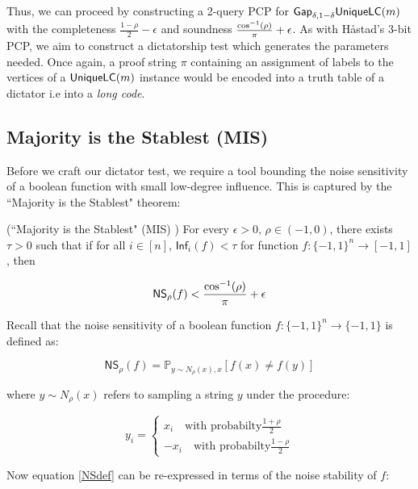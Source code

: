 Thus, we can proceed by constructing a 2-query PCP for $\mathsf{Gap}_{\delta, 1-\delta}\mathsf{UniqueLC}(m)$ with the completeness $\frac{1-\rho}{2} - \epsilon$ and soundness $\frac{\cos^{-1}(\rho)}{\pi} + \epsilon$. As with H\aa stad's 3-bit PCP, we aim to construct a dictatorship test which generates the parameters needed. Once again, a proof string $\pi$ containing an assignment of labels to the vertices of a $\mathsf{UniqueLC}(m)$ instance would be encoded into a truth table of a dictator i.e into a \emph{long code}. \newline

%
%
%
\subsection{Majority is the Stablest (MIS)}
%
Before we craft our dictator test, we require a tool bounding the noise sensitivity of a boolean function with small low-degree influence. This is captured by the ``Majority is the Stablest" theorem:

\begin{theorem} (``Majority is the Stablest" (MIS) \cite{mossel2005noise})
For every $\epsilon > 0$, $\rho \in (-1,0)$, there exists $\tau > 0$ such that if for all $i \in [n]$, $\mathsf{Inf}_i(f) < \tau$ for function $f:\{-1,1\}^n \rightarrow [-1,1]$, then

\begin{equation}
  \mathsf{NS}_{\rho}(f) < \frac{\cos^{-1}(\rho)}{\pi} + \epsilon
\end{equation}
\end{theorem}

Recall that the noise sensitivity of a boolean function $f:\{-1,1\}^n \rightarrow \{-1,1\}$ is defined as:

\begin{equation} \label{NSdef}
  \mathsf{NS}_\rho(f)  = \mathbb{P}_{y \sim N_{\rho}(x), x} [f(x) \neq f(y)]
\end{equation}

where $y \sim N_\rho(x)$ refers to sampling a string $y$ under the procedure:

\begin{equation*}
  y_i = \begin{cases}
        x_i \quad \text{with probabilty} \frac{1 + \rho}{2} \\
        -x_i \quad \text{with probabilty} \frac{1 - \rho}{2}
        \end{cases}
\end{equation*}
\newline

Now equation \ref{NSdef} can be re-expressed in terms of the noise stability of $f$:

